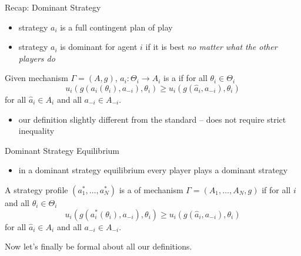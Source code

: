 \documentclass[english,10pt
,aspectratio=169
]{beamer}
\begin{document}
\begin{frame}{Recap: Dominant Strategy}
	\begin{itemize}
		\item strategy $a_i$ is a full contingent plan of play
		\item strategy $a_i$ is \alert{dominant} for agent $i$ if it is best \emph{no matter what the other players do}
	\end{itemize}
	\begin{definition}
		Given mechanism $\Gamma=(A,g)$,
		$a_{i}: \Theta_{i}\rightarrow A_{i}$ is a  if for all $\theta_{i}\in \Theta_{i}$
		$$ u_{i}(g(a_{i}(\theta_{i}),a_{-i}),\theta_{i})\geq u_{i}(g(\hat a_{i},a_{-i}),\theta_{i})$$
		for all $\hat a_{i}\in A_{i}$  and all $a_{-i}\in A_{-i}$.
	\end{definition}
	\begin{itemize}
		\item our definition slightly different from the standard -- does not require strict inequality
	\end{itemize}
\end{frame}


\begin{frame}{Dominant Strategy Equilibrium}
	\begin{itemize}
		\item in a \alert{dominant strategy equilibrium} every player plays a dominant strategy
	\end{itemize}
	\begin{definition}
		A strategy profile $(a_1^*,\dots,a_N^*)$ is a  of mechanism  $\Gamma=(A_{1},\dots,A_{N},g)$ if for all $i$ and all $\theta_{i}\in \Theta_{i}$
		$$ u_{i}(g(a_{i}^{*}(\theta_{i}),a_{-i}),\theta_{i}) \geq u_{i}(g(\hat a_{i},a_{-i}), \theta_{i})$$
		for all $\hat a_{i}\in A_{i}$ and all $a_{-i}\in A_{-i}$.
	\end{definition}

	Now let's finally be formal about all our definitions.
\end{frame}
\end{document}

